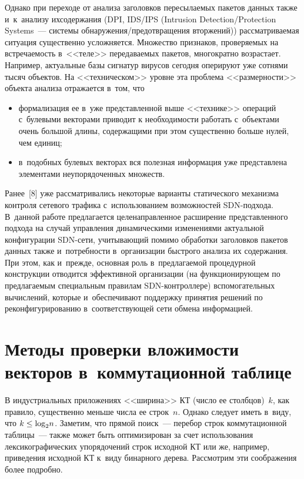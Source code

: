 \begin{multicols}{2}
  Однако при переходе от анализа заголовков пересылаемых пакетов данных 
также и~к~анализу их\linebreak  содержания (DPI, IDS/IPS (Intrusion Detection/\linebreak Protection 
Systems~--- системы обна\-ру\-же\-ния/пред\-от\-вра\-ще\-ния вторжений)) 
рас\-смат\-ри\-ва\-емая ситуация существенно усложняется. Множество признаков, 
проверяемых на встречаемость в~<<теле>> переда\-ва\-емых пакетов, многократно 
возрастает. Например, актуальные базы сигнатур вирусов сегодня оперируют 
уже сотнями тысяч объектов. На <<техническом>> уровне эта проблема 
<<размерности>> объекта анализа отражается в~том, что
\begin{itemize}
\item формализация ее в~уже представленной выше <<технике>> операций 
с~булевыми векторами приводит к необходимости работать с~объектами 
очень большой длины, содержащими при этом существенно больше нулей, 
чем единиц;
\item в~подобных булевых векторах вся полезная информация уже 
представлена элементами неупорядоченных множеств.
\end{itemize}

  Ранее~[8] уже рассматривались некоторые варианты статического механизма 
контроля сетевого трафика с~использованием возможностей SDN-под\-хо\-да. 
В~данной работе предлагается целенаправлен\-ное расширение представленного 
подхода на случай управления динамическими изменениями актуальной 
конфигурации SDN-се\-ти, учи\-ты\-ва\-ющий помимо обработки заголовков 
пакетов данных также и~потребности в~организации быстрого анализа их 
содержания. При этом, как и~прежде, основная роль в~предлагаемой 
процедурной конструкции отводится эффективной организации (на 
функционирующем по предлагаемым специальным правилам  
SDN-конт\-рол\-ле\-ре) вспомогательных вычислений, которые и~обеспечивают 
поддержку принятия решений по реконфигурированию в~со\-от\-вет\-ст\-ву\-ющей 
сети обмена информацией.

\vspace*{-6pt}

\section{Методы проверки вложимости векторов в~коммутационной таблице}

\vspace*{-2pt}
  
  В индустриальных приложениях <<ширина>> КТ (число ее столбцов)~$k$, 
как правило, существенно меньше числа ее строк~$n$. Однако следует иметь 
в~виду, что $k\hm\leq \mathrm{log}_2n$. Заметим, что прямой поиск~--- 
перебор строк коммутационной таблицы~--- также может быть оптимизирован 
за счет использования лексикографических упорядочений строк исходной КТ 
или же, например, приведения исходной КТ к~виду бинарного дерева. 
Рассмотрим эти соображения более подробно.
  

\end{multicols}
